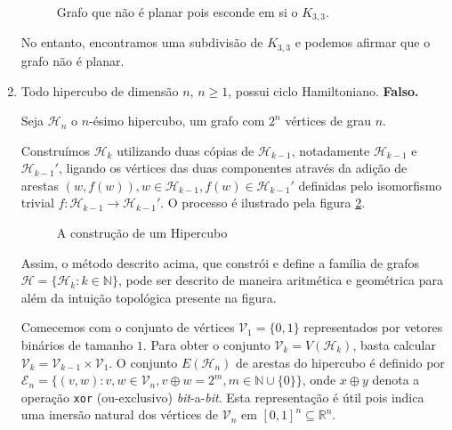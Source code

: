 \documentclass{homework}
\begin{document}
\begin{enumerate}[label=\textbf{\arabic*)}]
	\begin{figure}[H]
		\centering
		
		\caption{Grafo que não é planar pois esconde em si o $K_{3,3}$.}
		\label{fig:1.5.1}
	\end{figure}
	
	No entanto, encontramos uma subdivisão de $K_{3, 3}$ e podemos afirmar que o grafo não é planar.
	
	\item Todo hipercubo de dimensão $n$, $n \ge 1$, possui ciclo Hamiltoniano. \textbf{Falso.}
	
	Seja $\mathscr{H}_n$ o $n$-ésimo hipercubo, um grafo com $2^n$ vértices de grau $n$. \par
	
	Construímos $\mathscr{H}_k$ utilizando duas cópias de $\mathscr{H}_{k-1}$, notadamente $\mathscr{H}_{k-1}$ e $\mathscr{H}_{k-1}'$, ligando os vértices das duas componentes através da adição de arestas $(w, f(w)), w \in \mathscr{H}_{k-1}, f(w) \in \mathscr{H}_{k-1}'$ definidas pelo isomorfismo trivial $f:\mathscr{H}_{k-1}\to\mathscr{H}_{k-1}'$. O processo é ilustrado pela figura \ref{fig:1.6.1}. \par

	\begin{figure}[H]
		\centering
		
		\caption{A construção de um Hipercubo}
		\label{fig:1.6.1}
	\end{figure}

	Assim, o método descrito acima, que constrói e define a família de grafos $\mathscr{H} = \{\mathscr{H}_{k} : k \in \mathbb{N}\}$, pode ser descrito de maneira aritmética e geométrica para além da intuição topológica presente na figura.\par
	
	Comecemos com o conjunto de vértices $\mathscr{V}_1 = \{0, 1\}$ representados por vetores binários de tamanho $1$. Para obter o conjunto $\mathscr{V}_k = V(\mathscr{H}_k)$, basta calcular $\mathscr{V}_k = \mathscr{V}_{k-1} \times \mathscr{V}_1$. O conjunto $E(\mathscr{H}_n)$ de arestas do hipercubo é definido por $\mathscr{E}_n = \{(v, w) : v, w \in \mathscr{V}_n, v \oplus w = 2^{m}, m \in \mathbb{N} \cup \{0\}\}$, onde $x \oplus y$ denota a operação \texttt{xor} (ou-exclusivo) \textit{bit}-a-\textit{bit}. Esta representação é útil pois indica uma imersão natural dos vértices de $\mathscr{V}_n$ em $[0, 1]^{n} \subseteq\mathbb{R}^n$.\par


\end{enumerate}
\end{document}
